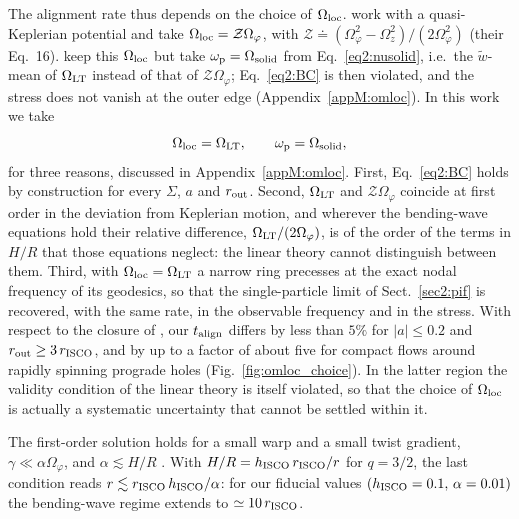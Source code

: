 The alignment rate thus depends on the choice of $\Omega_\textup{loc}$.
\citet{FoucartLai2014} work with a quasi-Keplerian potential and take $\Omega_\textup{loc}=\mathcal{Z}\Omega_\varphi$, with $\mathcal{Z}\doteq(\Omega_\varphi^2-\Omega_z^2)/(2\Omega_\varphi^2)$ (their Eq.~16).
\citet{Motta2017} keep this $\Omega_\textup{loc}$ but take $\omega_\textup{p}=\Omega_\textup{solid}$ from Eq.~\eqref{eq2:nusolid}, i.e.\ the $\tilde w$-mean of $\Omega_\textup{LT}$ instead of that of $\mathcal{Z}\Omega_\varphi$; Eq.~\eqref{eq2:BC} is then violated, and the stress does not vanish at the outer edge (Appendix~\ref{appM:omloc}).
In this work we take
\begin{equation}
    \label{eq2:omloc}
    \Omega_\textup{loc}=\Omega_\textup{LT},
    \qquad
    \omega_\textup{p}=\Omega_\textup{solid},
\end{equation}
for three reasons, discussed in Appendix~\ref{appM:omloc}.
First, Eq.~\eqref{eq2:BC} holds by construction for every $\Sigma$, $a$ and $r_\textup{out}$.
Second, $\Omega_\textup{LT}$ and $\mathcal{Z}\Omega_\varphi$ coincide at first order in the deviation from Keplerian motion, and wherever the bending-wave equations hold their relative difference, $\Omega_\textup{LT}/(2\Omega_\varphi)$, is of the order of the terms in $H/R$ that those equations neglect: the linear theory cannot distinguish between them.
Third, with $\Omega_\textup{loc}=\Omega_\textup{LT}$ a narrow ring precesses at the exact nodal frequency of its geodesics, so that the single-particle limit of Sect.~\ref{sec2:pif} is recovered, with the same rate, in the observable frequency and in the stress.
With respect to the closure of \citet{Motta2017}, our $t_\textup{align}$ differs by less than $5\%$ for $|a|\leq0.2$ and $r_\textup{out}\geq3\,r_\textup{ISCO}$, and by up to a factor of about five for compact flows around rapidly spinning prograde holes (Fig.~\ref{fig:omloc_choice}).
In the latter region the validity condition of the linear theory is itself violated, so that the choice of $\Omega_\textup{loc}$ is actually a systematic uncertainty that cannot be settled within it.

The first-order solution holds for a small warp and a small twist gradient, $\gamma\ll\alpha\Omega_\varphi$, and $\alpha\lesssim H/R$ \citep{FoucartLai2014}.
With $H/R=h_\textup{ISCO}\,r_\textup{ISCO}/r$ for $q=3/2$, the last condition reads $r\lesssim r_\textup{ISCO}\,h_\textup{ISCO}/\alpha$: for our fiducial values $(h_\textup{ISCO} = 0.1,\,\alpha=0.01)$ the bending-wave regime extends to $\simeq10\,r_\textup{ISCO}$.


